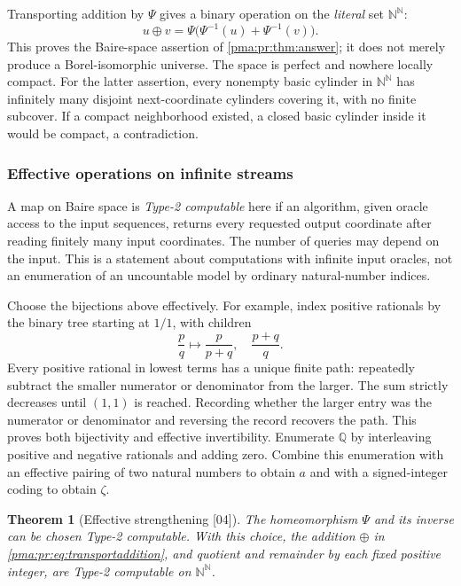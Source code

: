 \documentclass[11pt]{article}
\numberwithin{equation}{section}
\newtheorem{theorem}{Theorem}[section]
\theoremstyle{definition}
\theoremstyle{remark}
\newcommand{\N}{\mathbb N}
\newcommand{\Q}{\mathbb Q}
\newcommand{\Baire}{\N^{\N}}
\newcommand{\src}[1]{\textup{\textsf{\small[#1]}}}
\begin{document}
Transporting addition by $\Psi$ gives a binary operation on the \emph{literal}
set $\Baire$:
\begin{equation}\label{pma:pr:eq:transportaddition}
 u\oplus v=\Psi\bigl(\Psi^{-1}(u)+\Psi^{-1}(v)\bigr).
\end{equation}
This proves the Baire-space assertion of \cref{pma:pr:thm:answer}; it does not
merely produce a Borel-isomorphic universe. The space is perfect and
nowhere locally compact. For the latter assertion, every nonempty basic
cylinder in $\Baire$ has infinitely many disjoint next-coordinate cylinders
covering it, with no finite subcover. If a compact neighborhood existed,
a closed basic cylinder inside it would be compact, a contradiction.

\subsubsection{Effective operations on infinite streams}
\label{pma:pr:subsec:effective}

A map on Baire space is \emph{Type-2 computable} here if an algorithm, given
oracle access to the input sequences, returns every requested output
coordinate after reading finitely many input coordinates. The number of
queries may depend on the input. This is a statement about computations
with infinite input oracles, not an enumeration of an uncountable model by
ordinary natural-number indices.

Choose the bijections above effectively. For example, index positive
rationals by the binary tree starting at $1/1$, with children
\[
 \frac pq\longmapsto\frac{p}{p+q},\quad\frac{p+q}{q}.
\]
Every positive rational in lowest terms has a unique finite path: repeatedly
subtract the smaller numerator or denominator from the larger. The sum
strictly decreases until $(1,1)$ is reached. Recording whether the larger
entry was the numerator or denominator and reversing the record recovers
the path. This proves both bijectivity and effective invertibility.
Enumerate $\Q$ by interleaving positive and negative rationals and adding
zero. Combine this enumeration with an effective pairing of two natural
numbers to obtain $a$ and with a signed-integer coding to obtain $\zeta$.

\begin{theorem}[Effective strengthening \src{04}]\label{pma:pr:thm:effective}
The homeomorphism $\Psi$ and its inverse can be chosen Type-2 computable.
With this choice, the addition $\oplus$ in \eqref{pma:pr:eq:transportaddition},
and quotient and remainder by each fixed positive integer, are Type-2
computable on $\Baire$.
\end{theorem}
\end{document}
